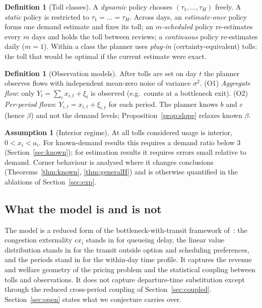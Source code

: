 \documentclass[11pt]{article}
\theoremstyle{definition}
\newtheorem{definition}[theorem]{Definition}
\newtheorem{assumption}[theorem]{Assumption}
\theoremstyle{remark}
\begin{document}
\begin{definition}[Toll classes]\label{def:classes}
A \emph{dynamic} policy chooses $(\tau_1,\dots,\tau_H)$ freely. A \emph{static} policy is restricted to $\tau_1=\dots=\tau_H$. Across days, an \emph{estimate-once} policy forms one demand estimate and fixes its toll; an \emph{$m$-scheduled} policy re-estimates every $m$ days and holds the toll between reviews; a \emph{continuous} policy re-estimates daily ($m=1$). Within a class the planner uses \emph{plug-in} (certainty-equivalent) tolls: the toll that would be optimal if the current estimate were exact.
\end{definition}

\begin{definition}[Observation models]\label{def:obs}
After tolls are set on day $t$ the planner observes flows with independent mean-zero noise of variance $\sigma^2$. (O1) \emph{Aggregate flow}: only $Y_t=\sum_ix_{i,t}+\xi_t$ is observed (e.g.\ counts at a bottleneck exit). (O2) \emph{Per-period flows}: $Y_{i,t}=x_{i,t}+\xi_{i,t}$ for each period. The planner knows $b$ and $c$ (hence $\beta$) and not the demand levels; Proposition~\ref{prop:slope} relaxes known $\beta$.
\end{definition}

\begin{assumption}[Interior regime]\label{ass:interior}
At all tolls considered usage is interior, $0<x_i<a_i$. For known-demand results this requires a demand ratio below $3$ (Section~\ref{sec:known}); for estimation results it requires errors small relative to demand. Corner behaviour is analysed where it changes conclusions (Theorems~\ref{thm:known}, \ref{thm:generalH}) and is otherwise quantified in the ablations of Section~\ref{sec:exp}.
\end{assumption}

\subsection{What the model is and is not}
The model is a reduced form of the bottleneck-with-transit framework of~\cite{jde2026}: the congestion externality $cx_i$ stands in for queueing delay, the linear value distribution stands in for the transit outside option and scheduling preferences, and the periods stand in for the within-day time profile. It captures the revenue and welfare geometry of the pricing problem and the statistical coupling between tolls and observations. It does not capture departure-time substitution except through the reduced cross-period coupling of Section~\ref{sec:coupled}. Section~\ref{sec:open} states what we conjecture carries over.
\end{document}
